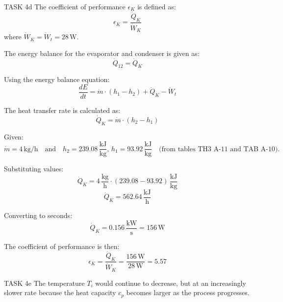 TASK 4d  
The coefficient of performance \( \epsilon_K \) is defined as:  
\[
\epsilon_K = \frac{\dot{Q}_K}{\dot{W}_K}
\]  
where \( \dot{W}_K = \dot{W}_t = 28 \, \text{W} \).  

The energy balance for the evaporator and condenser is given as:  
\[
\dot{Q}_{12} = \dot{Q}_K
\]  

Using the energy balance equation:  
\[
\frac{dE}{dt} = \dot{m} \cdot (h_1 - h_2) + \dot{Q}_K - \dot{W}_t
\]  

The heat transfer rate is calculated as:  
\[
\dot{Q}_K = \dot{m} \cdot (h_2 - h_1)
\]  

Given:  
\[
\dot{m} = 4 \, \text{kg/h} \quad \text{and} \quad h_2 = 239.08 \, \frac{\text{kJ}}{\text{kg}}, \, h_1 = 93.92 \, \frac{\text{kJ}}{\text{kg}} \quad \text{(from tables TH3 A-11 and TAB A-10)}.
\]  

Substituting values:  
\[
\dot{Q}_K = 4 \, \frac{\text{kg}}{\text{h}} \cdot (239.08 - 93.92) \, \frac{\text{kJ}}{\text{kg}}
\]  
\[
\dot{Q}_K = 562.64 \, \frac{\text{kJ}}{\text{h}}
\]  

Converting to seconds:  
\[
\dot{Q}_K = 0.156 \, \frac{\text{kW}}{\text{s}} = 156 \, \text{W}
\]  

The coefficient of performance is then:  
\[
\epsilon_K = \frac{\dot{Q}_K}{\dot{W}_K} = \frac{156 \, \text{W}}{28 \, \text{W}} = 5.57
\]  

TASK 4e  
The temperature \( T_i \) would continue to decrease, but at an increasingly slower rate because the heat capacity \( c_p \) becomes larger as the process progresses.